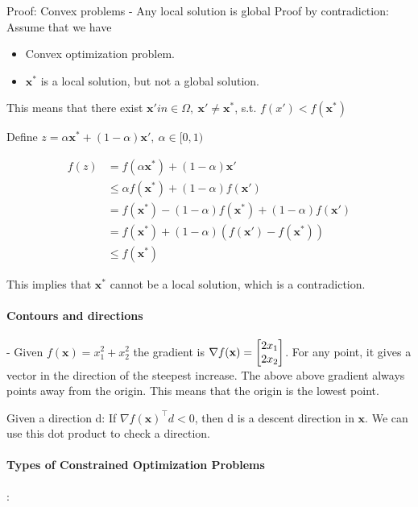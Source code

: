 \documentclass{article}
\begin{document}
\begin{proofbox}{Proof: Convex problems - Any local solution is global}
  Proof by contradiction: Assume that we have
  \begin{itemize}
    \item Convex optimization problem.
    \item $\mathbf{x^*}$ is a local solution, but not a global solution.
  \end{itemize}
  This means that there exist $\mathbf{x'} in \in\Omega ,\ \mathbf{x'} \neq \mathbf{x^*}$, s.t. $f(x') < f(\mathbf{x^*})$

  \medskip

  Define $z = \alpha \mathbf{x^*} + (1-\alpha) \mathbf{x'},\  \alpha\in [ 0,1)$

  \begin{align*}
    f(z) & = f (\alpha \mathbf{x^*}) + (1-\alpha) \mathbf{x'}                        \\
         & \leq \alpha f(\mathbf{x^*}) + (1-\alpha) f(\mathbf{x'})                   \\
         & =f(\mathbf{x^*}) - (1-\alpha) f(\mathbf{x^*}) + (1-\alpha) f(\mathbf{x'}) \\
         & = f(\mathbf{x^*}) + (1-\alpha) (f(\mathbf{x'}) - f(\mathbf{x^*}))         \\
         & \leq f(\mathbf{x^*})
  \end{align*}

  This implies that $\mathbf{x^*}$ cannot be a local solution, which is a contradiction.
\end{proofbox}

\paragraph{Contours and directions} -
Given $f(\mathbf{x}) = x_1^2 + x_2^2$ the gradient is $\nabla f(\mathbf{x}) = \begin{bmatrix} 2x_1 \\ 2x_2 \end{bmatrix}$. For any point, it gives a vector in the
direction of the steepest increase. The above above gradient always points away from the origin. This means that the origin is the lowest point.

\medskip Given a direction d: If $\nabla f(\mathbf{x})^{\top}d < 0$, then d is a descent direction in $\mathbf{x}$. We can use this
dot product to check a direction.

\paragraph{Types of Constrained Optimization Problems} :
\end{document}
